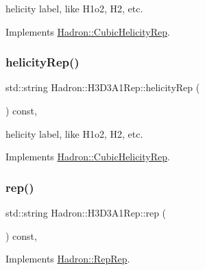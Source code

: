 helicity label, like H1o2, H2, etc. 

Implements \mbox{\hyperlink{structHadron_1_1CubicHelicityRep_af1096946b7470edf0a55451cc662f231}{Hadron\+::\+Cubic\+Helicity\+Rep}}.

\mbox{\label{structHadron_1_1H3D3A1Rep_a70ba9574e123f458fa29aae49a92f425}} 
\subsubsection{\texorpdfstring{helicityRep()}{helicityRep()}\hspace{0.1cm}{\footnotesize\ttfamily [2/2]}}
{\footnotesize\ttfamily std\+::string Hadron\+::\+H3\+D3\+A1\+Rep\+::helicity\+Rep (\begin{DoxyParamCaption}{ }\end{DoxyParamCaption}) const\hspace{0.3cm}{\ttfamily [inline]}, {\ttfamily [virtual]}}

helicity label, like H1o2, H2, etc. 

Implements \mbox{\hyperlink{structHadron_1_1CubicHelicityRep_af1096946b7470edf0a55451cc662f231}{Hadron\+::\+Cubic\+Helicity\+Rep}}.

\mbox{\label{structHadron_1_1H3D3A1Rep_a79c066008e353585d55f726285ae56cd}} 
\subsubsection{\texorpdfstring{rep()}{rep()}\hspace{0.1cm}{\footnotesize\ttfamily [1/3]}}
{\footnotesize\ttfamily std\+::string Hadron\+::\+H3\+D3\+A1\+Rep\+::rep (\begin{DoxyParamCaption}{ }\end{DoxyParamCaption}) const\hspace{0.3cm}{\ttfamily [inline]}, {\ttfamily [virtual]}}



Implements \mbox{\hyperlink{structHadron_1_1RepRep_ab3213025f6de249f7095892109575fde}{Hadron\+::\+Rep\+Rep}}.

\mbox{\label{structHadron_1_1H3D3A1Rep_a79c066008e353585d55f726285ae56cd}} 
